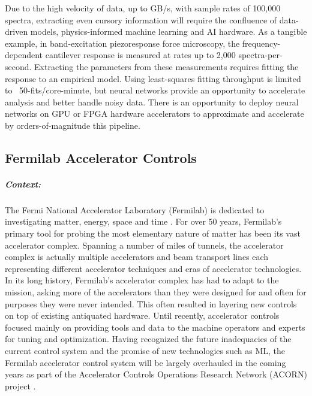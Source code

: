Due to the high velocity of data, up to GB/s, with sample rates of 100,000 spectra, extracting even cursory information will require the confluence of data-driven models, physics-informed machine learning and AI hardware. 
As a tangible example, in band-excitation piezoresponse force microscopy, the frequency-dependent cantilever response is measured at rates up to 2,000 spectra-per-second. 
Extracting the parameters from these measurements requires fitting the response to an empirical model. Using least-squares fitting throughput is limited to ~50-fits/core-minute, but neural networks provide an opportunity to accelerate analysis and better handle noisy data\cite{Borodinov2019-pn}. 
There is an opportunity to deploy neural networks on GPU or FPGA hardware accelerators to approximate and accelerate by orders-of-magnitude this pipeline.
  
 

\subsection{Fermilab Accelerator Controls}

\subparagraph*{Context:} 
            The Fermi National Accelerator Laboratory (Fermilab) is dedicated to investigating matter, energy, space and time \cite{fermilab_about}. 
            For over 50 years, Fermilab's primary tool for probing the most elementary nature of matter has been its vast accelerator complex. Spanning a number of miles of tunnels, the accelerator complex is actually multiple accelerators and beam transport lines each representing different accelerator techniques and eras of accelerator technologies. 
            In its long history, Fermilab's accelerator complex has had to adapt to the mission, asking more of the accelerators than they were designed for and often for purposes they were never intended. 
            This often resulted in layering new controls on top of existing antiquated hardware. 
            Until recently, accelerator controls focused mainly on providing tools and data to the machine operators and experts for tuning and optimization. 
            Having recognized the future inadequacies of the current control system and the promise of new technologies such as ML, the Fermilab accelerator control system will be largely overhauled in the coming years as part of the Accelerator Controls Operations Research Network (ACORN) project \cite{acorn_paper}. 
            
